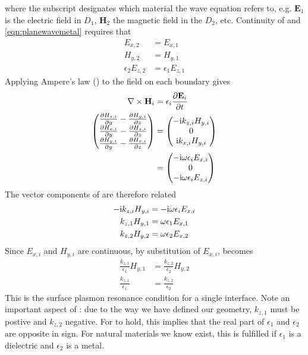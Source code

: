 where the subscript designates which material the wave equation refers to,
e.g. $\mathbf{E}_1$ is the electric field in $D_1$, $\mathbf{H}_2$
the magnetic field in the $D_2$, etc. Continuity of
 and
\ref{eqn:planewavemetal} requires that
\begin{align}
E_{x,2}&=E_{x,1}\\
H_{y,2}&=H_{y,1}\\
\epsilon_2 E_{z,2}&=\epsilon_1 E_{z,1}
\end{align}
Applying Ampere's law () to the field on 
each boundary gives
\begin{align}
\nabla \times \mathbf{H}_i &= \epsilon_i \frac{\partial \mathbf{E}_i}{\partial t}\\
\begin{pmatrix}
\frac{\partial H_{z,i}}{\partial y} - \frac{\partial H_{y,i}}{\partial z}\\
\frac{\partial H_{x,i}}{\partial y} - \frac{\partial H_{z,i}}{\partial z}\\
\frac{\partial H_{y,i}}{\partial y} - \frac{\partial H_{x,i}}{\partial z}
\end{pmatrix}
&= \begin{pmatrix}
-{\mathrm{i}} k_{z,i} H_{y,i}\\
0\\
{\mathrm{i}} k_{x,i} H_{y,i}
\end{pmatrix}
\\
&= \begin{pmatrix}
-{\mathrm{i}} \omega \epsilon_i E_{x,i}\\
0\\
-{\mathrm{i}} \omega \epsilon_i E_{z,i}
\end{pmatrix}
\label{eqn:vectordisp}
\end{align}
The vector components of  are therefore related 
\begin{align}
-{\mathrm{i}} k_{z,i} H_{y,i} &= -{\mathrm{i}} \omega \epsilon_i E_{x,i}\\
k_{z,1} H_{y,1} &= \omega \epsilon_1 E_{x,1}\\
k_{z,2} H_{y,2} &= \omega \epsilon_2 E_{x,2}
\label{eqn:spderivsteptwo}
\end{align}
Since $E_{x,i}$ and $H_{y,i}$ are continuous,
by substitution of $E_{x,i}$,  becomes
\begin{align}
\frac{k_{z,1}}{\epsilon_1}H_{y,1}&=\frac{k_{z,2}}{\epsilon_2}H_{y,2}\\ 
\frac{k_{z,1}}{\epsilon_1}&=\frac{k_{z,2}}{\epsilon_2} 
\label{eqn:sprcondition}
\end{align}
This is the surface plasmon resonance condition for a single interface.  Note an important aspect
of :  due to the way we have defined our
geometry, $k_{z,1}$ must be postive and $k_{z,2}$ negative.  For
 to hold, this implies that the real part of
$\epsilon_1$ and $\epsilon_2$ are opposite in sign.  For natural materials we know
exist, this is fulfilled if $\epsilon_1$ is a dielectric and $\epsilon_2$
is a metal.
